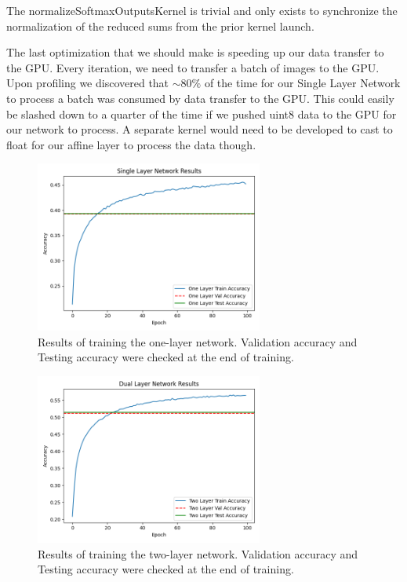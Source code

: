 \documentclass[conference]{IEEEtran}
\begin{document}
The normalizeSoftmaxOutputsKernel is trivial and only exists to synchronize the normalization of the reduced sums from the prior kernel launch. 

The last optimization that we should make is speeding up our data transfer to the GPU. Every iteration, we need to transfer a batch of images to the GPU. Upon profiling we discovered that $\sim{80\%}$ of the time for our Single Layer Network to process a batch was consumed by data transfer to the GPU. This could easily be slashed down to a quarter of the time if we pushed uint8 data to the GPU for our network to process. A separate kernel would need to be developed to cast to float for our affine layer to process the data though.


\begin{figure}[htbp]
\centerline{\includegraphics[width=75mm]{OneLayerResults}}
\caption{Results of training the one-layer network. Validation accuracy and Testing accuracy were checked at the end of training.}
\label{fig:oneLayerTrainResults}
\end{figure}

\begin{figure}[htbp]
\centerline{\includegraphics[width=75mm]{DualLayerResults}}
\caption{Results of training the two-layer network. Validation accuracy and Testing accuracy were checked at the end of training.}
\label{fig:dualLayerTrainResults}
\end{figure}
\end{document}
